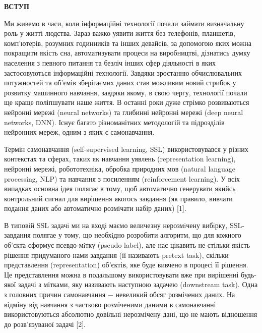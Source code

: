 
\begin{center}
\textbf{ВСТУП}
\end{center}

Ми живемо в часи, коли інформаційні технології почали займати визначальну роль у житті людства. Зараз важко уявити життя без телефонів, планшетів, комп'ютерів, розумних годинників та інших девайсів, за допомогою яких можна покращити якість сна, автоматизувати процеси на виробництві, дізнатись думку населення з певного питання та безліч інших сфер діяльності в яких застосовуються інформаційні технології. Завдяки зростанню обчислювальних потужностей та об'ємів зберігаємих даних став можливим новий стрибок у розвитку машинного навчання, завдяки якому, в свою чергу, технології почали ще краще поліпшувати наше життя. В останні роки дуже стрімко розвиваються нейронні мережі (neural networks) та глибинні нейронні мережі (deep neural networks, DNN). Існує багато різноманітних методологій та підрозділів нейронних мереж, одним з яких є самонавчання.

Термін самонавчання (self-supervised learning, SSL) використовувався у різних контекстах та сферах, таких як навчання уявлень (representation learning), нейронні мережі, робототехніка, обробка природних мов (natural language processing, NLP) та навчання з посиленням (reinforcement learning). У всіх випадках основна ідея полягає в тому, щоб автоматично генерувати якийсь контрольний сигнал для вирішення якогось завдання (як правило, вивчати подання даних або автоматично розмічати набір даних) [1].

В типовiй SSL задачi ми на входi маємо величезну нерозмiчену вибiрку, SSL-завдання полягае у тому, що необхiдно розробити алгоритм, що для кожного об’єкта сформує псевдо-мiтку (pseudo label), але нас цікавить не стільки якість рішення придуманого нами завдання (її називають pretext task), скільки представлення (representation) об'єктів, яке буде вивчено в процесі її рішення. Це представлення можна в подальшому використовувати вже при вирішенні будь-якої задачі з мітками, яку називають наступною задачею (downstream task). Одна з головних причин самонавчання $-$ невеликий обсяг розмічених даних. На відміну від навчання з частково розміченими даними в самонавчанні використовуються абсолютно довільні нерозмічену дані, що не мають відношення до розв'язуваної задачі [2].

